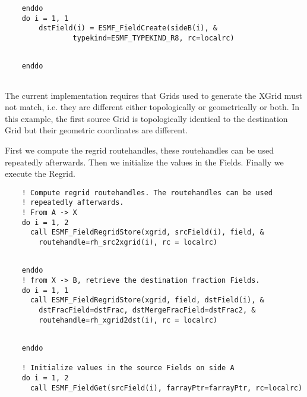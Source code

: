  \begin{verbatim}
    enddo
    do i = 1, 1
        dstField(i) = ESMF_FieldCreate(sideB(i), &
                typekind=ESMF_TYPEKIND_R8, rc=localrc)
 
\end{verbatim}
 

 \begin{verbatim}
    enddo
 
\end{verbatim}
 

  
   The current implementation requires that Grids used to generate the XGrid
   must not match, i.e. they are different either topologically or geometrically or both.
   In this example, the first source Grid is topologically identical to the destination
   Grid but their geometric coordinates are different.
  
   First we compute the regrid routehandles, these routehandles can be used repeatedly
   afterwards. Then we initialize the values in the Fields. Finally we execute the Regrid.
   

 \begin{verbatim}
    ! Compute regrid routehandles. The routehandles can be used
    ! repeatedly afterwards.
    ! From A -> X
    do i = 1, 2
      call ESMF_FieldRegridStore(xgrid, srcField(i), field, &
        routehandle=rh_src2xgrid(i), rc = localrc)
 
\end{verbatim}
 

 \begin{verbatim}
    enddo
    ! from X -> B, retrieve the destination fraction Fields.
    do i = 1, 1
      call ESMF_FieldRegridStore(xgrid, field, dstField(i), &
        dstFracField=dstFrac, dstMergeFracField=dstFrac2, &
        routehandle=rh_xgrid2dst(i), rc = localrc)
 
\end{verbatim}
 

 \begin{verbatim}
    enddo

    ! Initialize values in the source Fields on side A
    do i = 1, 2
      call ESMF_FieldGet(srcField(i), farrayPtr=farrayPtr, rc=localrc)
 
\end{verbatim}
 

